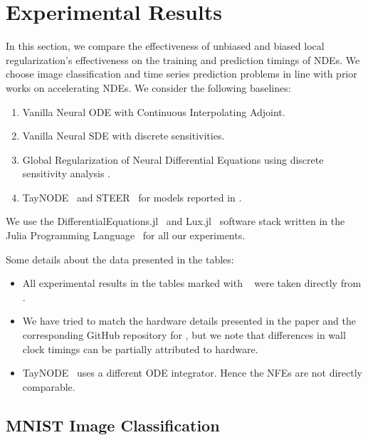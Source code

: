 \section{Experimental Results}
\label{sec:experimental_results_local_regularized_neural_des}

In this section, we compare the effectiveness of unbiased and biased local regularization's effectiveness on the training and prediction timings of NDEs. We choose image classification and time series prediction problems in line with prior works on accelerating NDEs. We consider the following baselines:
%
\begin{enumerate}
  \item Vanilla Neural ODE with Continuous Interpolating Adjoint.

  \item Vanilla Neural SDE with discrete sensitivities.

  \item Global Regularization of Neural Differential Equations using discrete sensitivity analysis \citep{pal2021opening}.

  \item TayNODE~\citep{kelly2020learning} and STEER~\citep{ghosh2020steer} for models reported in \citet{pal2021opening}.
\end{enumerate}
%

We use the DifferentialEquations.jl~\citep{rackauckas2019diffeqflux} and Lux.jl~\citep{pal2022lux} software stack written in the Julia Programming Language~\citep{Julia-2017} for all our experiments.

Some details about the data presented in the tables:
%
\begin{itemize}
  \item All experimental results in the tables marked with \textparagraph~ were taken directly from \citet{pal2021opening}.

  \item We have tried to match the hardware details presented in the paper and the corresponding GitHub repository for \citet{pal2021opening}, but we note that differences in wall clock timings can be partially attributed to hardware.

  \item TayNODE~\citep{kelly2020learning} uses a different ODE integrator. Hence the NFEs are not directly comparable.
\end{itemize}
%


\subsection{MNIST Image Classification}
\label{subsec:mnist}

